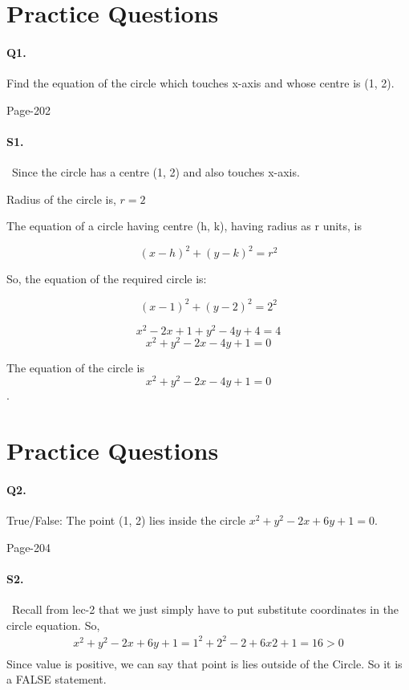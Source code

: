 \documentclass{article}
\begin{document}
\section*{Practice Questions}
\paragraph{Q1.}Find the equation of the circle which touches x-axis and whose centre is (1, 2).
\begin{flushright}
Page-202
\end{flushright}
\paragraph{S1.}\
Since the circle has a centre (1, 2) and also touches x-axis.

Radius of the circle is, $r = 2$

The equation of a circle having centre (h, k), having radius as r units, is

$$(x - h)^2 + (y - k)^2 = r^2$$

So, the equation of the required circle is:

$$(x - 1)^2 + (y - 2)^2 = 2^2$$

$$x^2 - 2x + 1 + y^2 - 4y + 4 = 4$$
$$ x^2 + y^2 - 2x - 4y + 1 = 0$$

The equation of the circle is $$x^2 + y^2 - 2x - 4y + 1 = 0$$.
\clearpage
\section*{Practice Questions}
\paragraph{Q2.}True/False: The point (1, 2) lies inside the circle $x^2 + y^2 - 2x + 6y + 1 = 0$.
\begin{flushright}
    Page-204
\end{flushright}
\paragraph{S2.}\
Recall from lec-2 that we just simply have to put substitute coordinates in the circle equation. So,
\begin{align*}
    x^2 + y^2 - 2x + 6y + 1 = 1^2+2^2-2+6x2+1=16>0\\
\end{align*} 
Since value is positive, we can say that point is lies outside of the Circle. So it is a FALSE statement.
\clearpage
\end{document}
